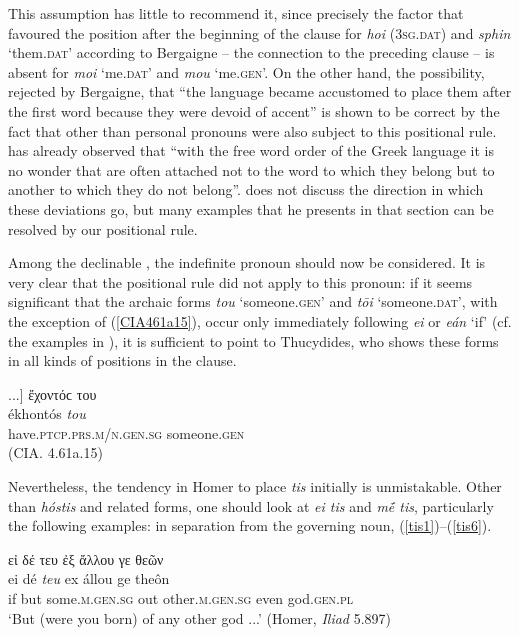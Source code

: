 This assumption has little to recommend it, since precisely the factor that favoured the position after the beginning of the clause for \textit{hoi} (\textsc{3sg.dat}) and \textit{sphin} `them.\textsc{dat}' according to Bergaigne -- the connection to the preceding clause -- is absent for \textit{moi} `me.\textsc{dat}' and \textit{mou} `me.\textsc{gen}'. On the other hand, the possibility, rejected by Bergaigne, that ``the language became accustomed to place them after the first word because they were devoid of accent'' is shown to be correct by the fact that  other than personal pronouns were also subject to this positional rule. \citet[268, note 8]{Kuehner1869} has already observed that ``with the free word order of the Greek language it is no wonder that  are often attached not to the word to which they belong but to another to which they do not belong''. \citeauthor{Kuehner1869} does not discuss the direction in which these deviations go, but many examples that he presents in that section can be resolved by our positional rule.

Among the declinable , the indefinite pronoun should now be considered. It is very clear that the positional rule did not apply to this pronoun: if it seems significant that the archaic forms \textit{tou} `someone.\textsc{gen}' and \textit{tōi} `someone.\textsc{dat}', with the exception of (\ref{CIA461a15}), occur only immediately following \textit{ei} or \textit{eán} `if' (cf. the examples in \citealp[123, note 1106]{Meisterhans1888}), it is sufficient to point to Thucydides, who shows these forms in all kinds of positions in the clause.

\begin{exe}
\ex {[}...{]} ἔχοντόϲ του\\
\gll ékhontós \emph{tou}\\
have.\textsc{ptcp.prs.m/n.gen.sg} someone.\textsc{gen}\\
\trans (CIA. 4.61a.15)
\label{CIA461a15}
\end{exe}


Nevertheless, the tendency in Homer to place \textit{tis} initially is unmistakable. Other than \textit{hóstis} and related forms, one should look at \textit{ei tis} and \textit{mḗ tis}, particularly the following examples:\label{greekseparation} in separation from the governing noun, (\ref{tis1})--(\ref{tis6}).

\begin{exe}
\ex εἰ δέ τευ ἐξ ἄλλου γε θεῶν\\
\gll ei dé \emph{teu} ex állou ge theôn\\
if but some.\textsc{m.gen.sg} out other.\textsc{m.gen.sg} even god.\textsc{gen.pl}\\
\trans `But (were you born) of any other god ...' (Homer, \textit{Iliad} 5.897)
\label{tis1}
\end{exe}

